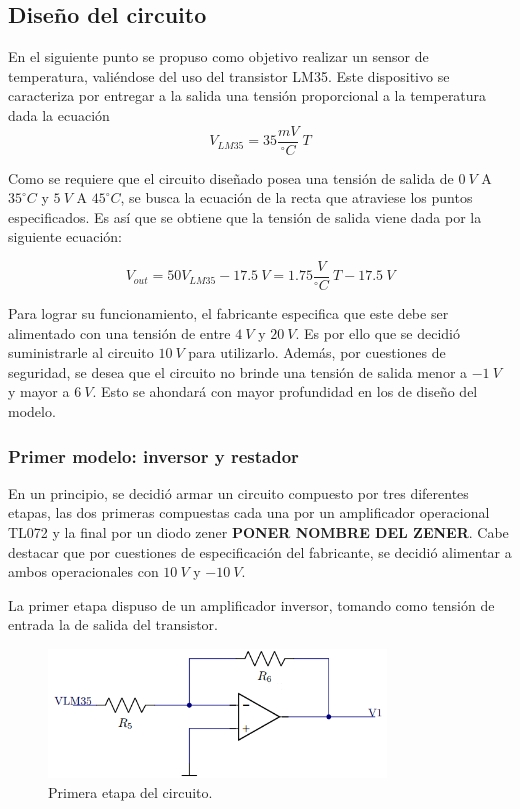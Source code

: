 \documentclass[a4paper]{article}
\begin{document}
\subsection{Diseño del circuito}

En el siguiente punto se propuso como objetivo realizar un sensor de temperatura, valiéndose del uso del transistor LM35. Este dispositivo se caracteriza por entregar a la salida una tensión proporcional a la temperatura dada la ecuación
\[
	V_{LM35} = 35 \frac{mV}{^{\circ}C} \ T
\]

Como se requiere que el circuito diseñado posea una tensión de salida de $ 0 \ V $ A $ 35 ^{\circ}C $ y $ 5 \ V $ A $ 45 ^{\circ}C $, se busca la ecuación de la recta que atraviese los puntos especificados. Es así que se obtiene que la tensión de salida viene dada por la siguiente ecuación:

\begin{equation}
	V_{out} = 50V_{LM35} - 17.5 \ V =  1.75 \frac{V}{^{\circ}C} \ T - 17.5 \ V
	\label{equ:sistema}
\end{equation}

Para lograr su funcionamiento, el fabricante especifica que este debe ser alimentado con una tensión de entre $4 \ V$ y $20 \ V$. Es por ello que se decidió suministrarle al circuito $10 \ V$ para utilizarlo.
Además, por cuestiones de seguridad, se desea que el circuito no brinde una tensión de salida menor a $-1 \ V$ y mayor a $6 \ V$. Esto se ahondará con mayor profundidad en los de diseño del modelo.

\subsubsection{Primer modelo: inversor y restador}

En un principio, se decidió armar un circuito compuesto por tres diferentes etapas, las dos primeras compuestas cada una por un amplificador operacional TL072 y la final por un diodo zener \textbf{PONER NOMBRE DEL ZENER}. Cabe destacar que por cuestiones de especificación del fabricante, se decidió alimentar a ambos operacionales con $10 \ V$ y $-10 \ V$.

La primer etapa dispuso de un amplificador inversor, tomando como tensión de entrada la de salida del transistor.

\begin{figure}[H]
	\centering
	\includegraphics[width=0.8\textwidth]{Ejercicio6/Imagenes/CircuitoEtapa1-M1.png}
\caption{Primera etapa del circuito.}
	\label{fig:cir1-M1}
\end{figure}
\end{document}
